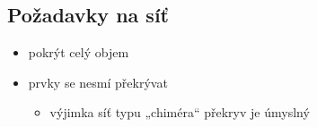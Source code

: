 \documentclass[letterpaper,10pt,czech]{sphinxmanual}
\begin{document}
\subsection{Požadavky na síť}
\label{\detokenize{prednaska_23092022:pozadavky-na-sit}}\begin{itemize}
\item {} 
\sphinxAtStartPar
pokrýt celý objem

\item {} 
\sphinxAtStartPar
prvky se nesmí překrývat
\begin{itemize}
\item {} 
\sphinxAtStartPar
výjimka \sphinxhyphen{} síť typu „chiméra“ \sphinxhyphen{} překryv je úmyslný

\end{itemize}

\end{itemize}
\end{document}
